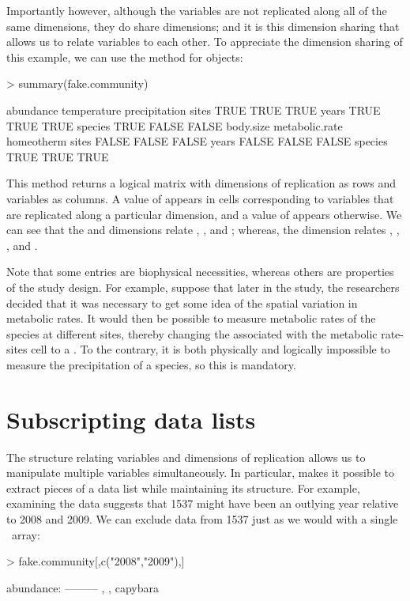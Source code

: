 \documentclass[a4paper]{report}
\begin{document}
\begin{article}
Importantly however, although the variables are not replicated along all of the same dimensions, they do share dimensions; and it is this dimension sharing that allows us to relate variables to each other.  To appreciate the dimension sharing of this example, we can use the  method for  objects:
\begin{Schunk}
\begin{Sinput}
> summary(fake.community)
\end{Sinput}
\begin{Soutput}
        abundance temperature precipitation
sites        TRUE        TRUE          TRUE
years        TRUE        TRUE          TRUE
species      TRUE       FALSE         FALSE
        body.size metabolic.rate homeotherm
sites       FALSE          FALSE      FALSE
years       FALSE          FALSE      FALSE
species      TRUE           TRUE       TRUE
\end{Soutput}
\end{Schunk}
This method returns a logical matrix with dimensions of replication as rows and variables as columns.  A value of  appears in cells corresponding to variables that are replicated along a particular dimension, and a value of  appears otherwise.  We can see that the  and  dimensions relate , , and ; whereas, the  dimension relates , , , and .

Note that some  entries are biophysical necessities, whereas others are properties of the study design.  For example, suppose that later in the study, the researchers decided that it was necessary to get some idea of the spatial variation in metabolic rates.  It would then be possible to measure metabolic rates of the species at different sites, thereby changing the  associated with the metabolic rate-sites cell to a .  To the contrary, it is both physically and logically impossible to measure the precipitation of a species, so this  is mandatory.

\section{Subscripting data lists}

The structure relating variables and dimensions of replication allows us to manipulate multiple variables simultaneously.  In particular,  makes it possible to extract pieces of a data list while maintaining its structure.  For example, examining the data suggests that 1537 might have been an outlying year relative to 2008 and 2009.  We can exclude data from 1537 just as we would with a single \R\ array:
\begin{Schunk}
\begin{Sinput}
> fake.community[,c("2008","2009"),]
\end{Sinput}
\begin{Soutput}
abundance:
---------
, , capybara


\end{Soutput}
\end{Schunk}
\end{article}
\end{document}
